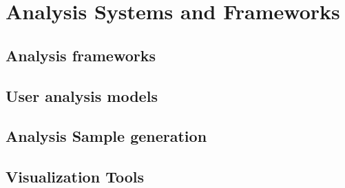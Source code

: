 %
\chapter{Analysis Systems and Frameworks} 
\section{Analysis frameworks}
\section{User analysis models}
\section{Analysis Sample generation}
\section{Visualization Tools}